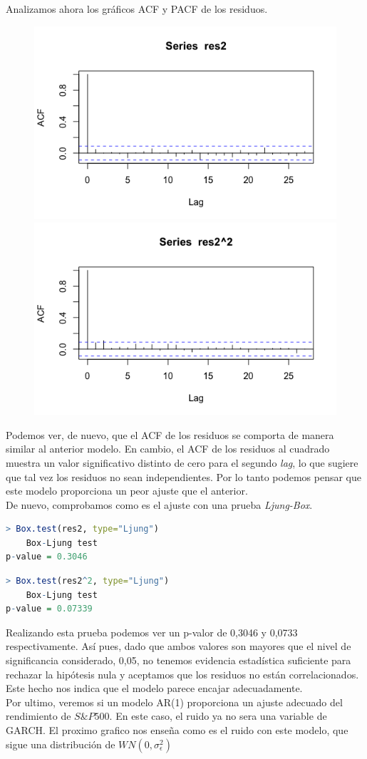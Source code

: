 \documentclass[a4paper,]{article}
\begin{document}
Analizamos ahora los gráficos ACF y PACF de los residuos.

\begin{figure}[H]
    \centering
    \includegraphics[width=0.4\linewidth]{res2.png}
    \includegraphics[width=0.4\linewidth]{res2^2.png}
\end{figure}

Podemos ver, de nuevo, que el ACF de los residuos se comporta de manera similar al anterior modelo. En cambio, el ACF de los residuos al cuadrado muestra un valor significativo distinto de cero para el segundo \textit{lag}, lo que sugiere que tal vez los residuos no sean independientes.
Por lo tanto podemos pensar que este modelo proporciona un peor ajuste que el anterior. \\

De nuevo, comprobamos como es el ajuste con una prueba \textit{Ljung-Box}.
\begin{lstlisting}[language=R]
> Box.test(res2, type="Ljung")
	Box-Ljung test
p-value = 0.3046
\end{lstlisting}
\begin{lstlisting}[language=R]
> Box.test(res2^2, type="Ljung")
	Box-Ljung test
p-value = 0.07339
\end{lstlisting}

Realizando esta prueba podemos ver un p-valor de 0,3046 y 0,0733 respectivamente. Así pues, dado que ambos valores son mayores que el nivel de significancia considerado, 0,05, no tenemos evidencia estadística suficiente para rechazar la hipótesis nula y aceptamos que los residuos no están correlacionados. Este hecho nos indica que el modelo parece encajar adecuadamente.\\


Por ultimo, veremos si un modelo AR(1) proporciona un ajuste adecuado del rendimiento de $S\&P500$.
En este caso, el ruido ya no sera una variable de GARCH. 
El proximo grafico nos enseña como es el ruido con este modelo, que sigue una distribución de $WN(0, \sigma_\epsilon^2)$
\end{document}
